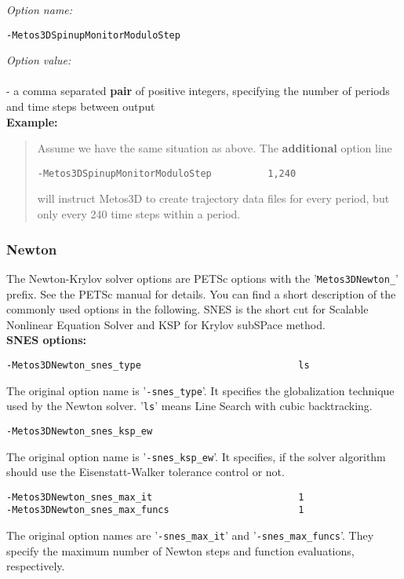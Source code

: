 \documentclass{article}
\begin{document}
\emph{Option name:}
\begin{verbatim}
-Metos3DSpinupMonitorModuloStep
\end{verbatim}

\emph{Option value:} \\
\vspace{-0.3cm}\\
- a comma separated \textbf{pair} of positive integers, specifying 
the number of periods and time steps between output \\

\textbf{Example:}
\begin{quote}
Assume we have the same situation as above. The \textbf{additional} option line
\begin{verbatim}
-Metos3DSpinupMonitorModuloStep          1,240
\end{verbatim}
will instruct Metos3D to create trajectory data files for every
period, but only every 240 time steps within a period.
\end{quote}

\subsubsection{Newton}

The Newton-Krylov solver options are PETSc options with the
'\texttt{Metos3DNewton\_}' prefix. See the PETSc manual for details.
You can find a short description of the commonly used options
in the following. SNES is the short cut for Scalable Nonlinear
Equation Solver and KSP for Krylov subSPace method. \\

\textbf{SNES options:}

\begin{verbatim}
-Metos3DNewton_snes_type                            ls
\end{verbatim}
The original option name is '\texttt{-snes\_type}'. It specifies the
globalization technique used by the Newton solver. '\texttt{ls}'
means Line Search with cubic backtracking.

\begin{verbatim}
-Metos3DNewton_snes_ksp_ew
\end{verbatim}
The original option name is '\texttt{-snes\_ksp\_ew}'. It specifies,
if the solver algorithm should use the Eisenstatt-Walker \cite{EisWal1996}
tolerance control or not.

\begin{verbatim}
-Metos3DNewton_snes_max_it                          1
-Metos3DNewton_snes_max_funcs                       1
\end{verbatim}
The original option names are '\texttt{-snes\_max\_it}' and '\texttt{-snes\_max\_funcs}'.
They specify the maximum number of Newton steps and function evaluations,
respectively.
\end{document}
